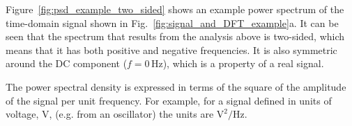 Figure~\ref{fig:psd_example_two_sided} shows an example power spectrum of the time-domain signal shown in Fig.~\ref{fig:signal_and_DFT_example}a. It can be seen that the spectrum that results from the analysis above is two-sided, which means that it has both positive and negative frequencies. It is also symmetric around the DC component ($f = $0\,Hz), which is a property of a real signal. 

The power spectral density is expressed in terms of the square of the amplitude of the signal per unit frequency. For example, for a signal defined in units of voltage, V, (e.g. from an oscillator) the units are $\mathrm{V^2/Hz}$.




